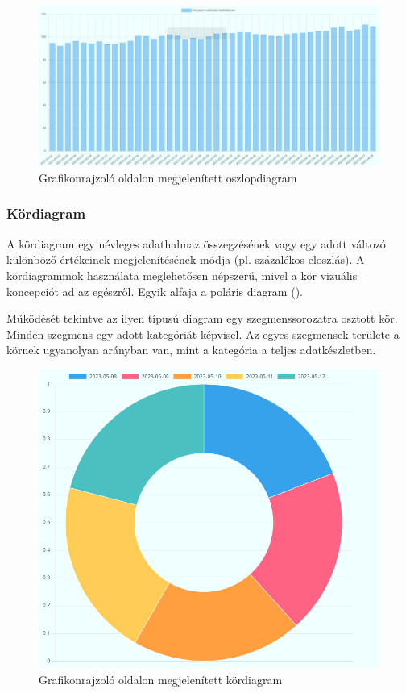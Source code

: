 \clearpage

\begin{figure}[h]
\centering
\includegraphics[scale=0.3]{images/barChartExample}
\caption{Grafikonrajzoló oldalon megjelenített oszlopdiagram}
\label{fig:barChartExample}
\end{figure}

\subsubsection{Kördiagram}

A kördiagram egy névleges adathalmaz összegzésének vagy egy adott változó különböző értékeinek megjelenítésének módja (pl. százalékos eloszlás). A kördiagrammok használata meglehetősen népszerű, mivel a kör vizuális koncepciót ad az egészről. Egyik alfaja a poláris diagram ().

	Működését tekintve az ilyen típusú diagram egy szegmenssorozatra osztott kör. Minden szegmens egy adott kategóriát képvisel. Az egyes szegmensek területe a körnek ugyanolyan arányban van, mint a kategória a teljes adatkészletben.

\begin{figure}[h]
\centering
\includegraphics[scale=0.4]{images/pieChartExample}
\caption{Grafikonrajzoló oldalon megjelenített kördiagram}
\label{fig:pieChartExample}
\end{figure}

